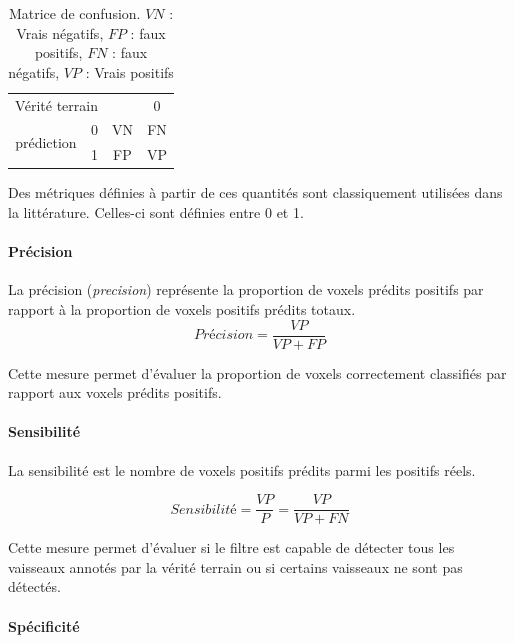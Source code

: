 \begin{table}
  \centering
  \begin{tabular}{ cccc }
    \hline
    \multicolumn{2}{c}{Vérité terrain}
                                      &   & 0  & 1 \\
      \multirow{2}{c}{prédiction}     & 0 & VN & FN \\
                                      & 1 & FP & VP  \\
    \hline
  \end{tabular}
  \caption{Matrice de confusion. $VN$ : Vrais négatifs, $FP$ : faux positifs, $FN$ : faux négatifs, $VP$ : Vrais positifs}
  \label{tab:confusion_matrix}
\end{table}

Des métriques définies à partir de ces quantités sont classiquement utilisées dans la littérature. Celles-ci sont définies entre 0 et 1.

\paragraph{Précision}
La précision (\textit{precision}) représente la proportion de voxels prédits positifs par rapport à la proportion de voxels positifs prédits totaux.
\begin{equation}
  Précision = \frac{VP}{VP+FP}
\end{equation}

Cette mesure permet d'évaluer la proportion de voxels correctement classifiés par rapport aux voxels prédits positifs.

\paragraph{Sensibilité}

La sensibilité est le nombre de voxels positifs prédits parmi les positifs réels.

\begin{equation}
  Sensibilité = \frac{VP}{P} = \frac{VP}{VP+FN}
\end{equation}

Cette mesure permet d'évaluer si le filtre est capable de détecter tous les vaisseaux annotés par la vérité terrain ou si certains vaisseaux ne sont pas détectés. 

\paragraph{Spécificité}

